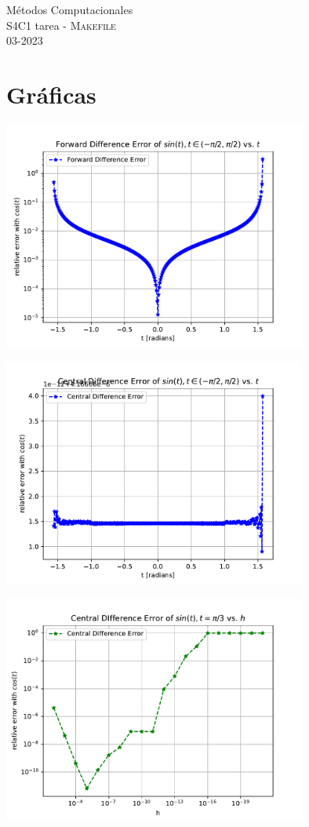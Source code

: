 \documentclass[11pt,letterpaper]{exam}
\begin{document}
\begin{center}
{\Large Métodos Computacionales} \\
S4C1 tarea - \textsc{Makefile}\\
03-2023\\
\end{center}


\noindent
\section{Gr\'aficas}
\begin{center}
\includegraphics[width=10cm]{err_derF.pdf} 
\begin{center}
\end{center}
\includegraphics[width=10cm]{err_derC.pdf} 
\end{center}
\begin{center}
\includegraphics[width=10cm]{err_der_h.pdf}
\end{center}
\end{document}
